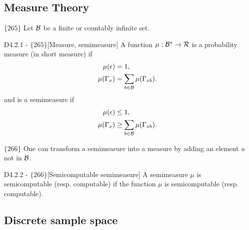 \documentclass{article}
\begin{document}
\subsection{Measure Theory}

$\{265\}$ Let $\mathcal{B}$ be a finite or countably infinite set. 


\begin{flexidefinition}{D4.2.1 - $\{265\}$}[Measure, semimeasure]
    A function $\mu : \mathcal{B}^\ast \to \mathcal{R}$ is a probability measure (in short measure) if 
    \begin{align}
        \mu(\epsilon) &= 1,\\
        \mu(\Gamma_x) &= \sum_{b \in \mathcal{B}} \mu(\Gamma_{xb}).
    \end{align}
    and is a semimeasure if 
    \begin{align}
        \mu(\epsilon) &\leq 1,\\
        \mu(\Gamma_x) &\geq \sum_{b \in \mathcal{B}} \mu(\Gamma_{xb}).
    \end{align}
\end{flexidefinition}
$\{266\}$ One can transform a semimeasure into a measure by adding an element $u$ not in $\mathcal{B}$.

\begin{flexidefinition}{D4.2.2 - $\{266\}$}[Semicomputable semimeasure]
    A semimeasure $\mu$ is semicomputable (resp. computable) if the function $\mu$ is semicomputable (resp. computable).
\end{flexidefinition}

\subsection{Discrete sample space}
\end{document}
